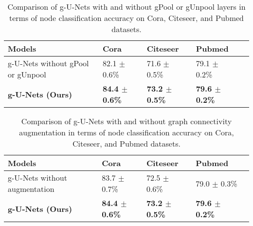 \documentclass{article}
\begin{document}
\begin{table*}[!th]
\centering \caption{Comparison of g-U-Nets with and without gPool or
gUnpool layers in terms of node classification accuracy on Cora,
Citeseer, and Pubmed datasets.} \label{table:gunet_vs_gunet_no_pool}
\begin{tabularx}{\textwidth}{  lx{3cm}   YYY }
    \hline
    \textbf{Models}       & \textbf{Cora} & \textbf{Citeseer} & \textbf{Pubmed} \\ \hline\hline
    g-U-Nets without gPool or gUnpool        & 82.1 $\pm$ 0.6\%   & 71.6 $\pm$ 0.5\% & 79.1 $\pm$ 0.2\% \\ \hline
    \textbf{g-U-Nets (Ours)}                           & \textbf{84.4 $\pm$ 0.6\%}
                                                    & \textbf{73.2 $\pm$ 0.5\%}
                                                    & \textbf{79.6 $\pm$ 0.2\%} \\ \hline
    \hline
\end{tabularx}
\end{table*}

\begin{table*}[!th]
\centering \caption{Comparison of g-U-Nets with and without graph
connectivity augmentation in terms of node classification accuracy
on Cora, Citeseer, and Pubmed datasets. }
\label{table:gunet_vs_gunet_no_aug}
\begin{tabularx}{\textwidth}{  lx{3.5cm}   YYY }
    \hline
    \textbf{Models}       & \textbf{Cora} & \textbf{Citeseer} & \textbf{Pubmed} \\ \hline\hline
    g-U-Nets without augmentation       & 83.7 $\pm$ 0.7\%   & 72.5 $\pm$ 0.6\% & 79.0 $\pm$ 0.3\% \\ \hline
    \textbf{g-U-Nets (Ours)}                         & \textbf{84.4 $\pm$ 0.6\%}
                                                    & \textbf{73.2 $\pm$ 0.5\%}
                                                    & \textbf{79.6 $\pm$ 0.2\%} \\ \hline
    \hline
\end{tabularx}
\end{table*}
\end{document}

